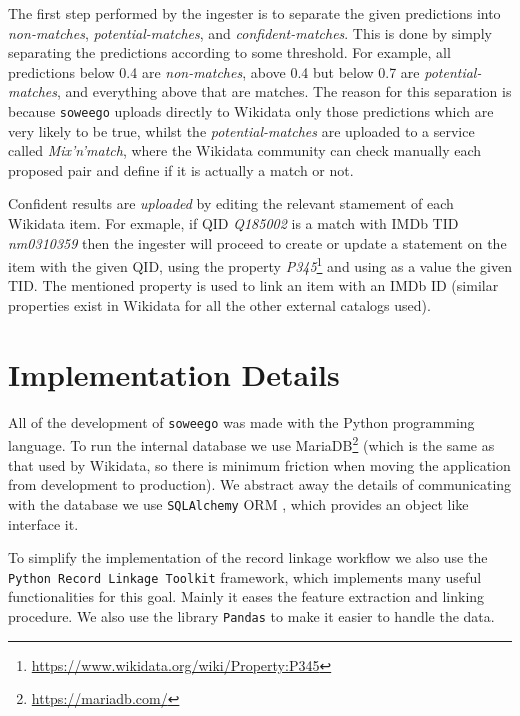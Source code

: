 \documentclass[epsfig,a4paper,11pt,titlepage,twoside,openany]{book}
\newcommand{\footurl}[1]{\footnote{\url{#1}}}
\begin{document}
The first step performed by the ingester is to separate the given predictions into \textit{non-matches}, \textit{potential-matches}, and \textit{confident-matches}. This is done by simply separating the predictions according to some threshold. For example, all predictions below 0.4 are \textit{non-matches}, above 0.4 but below 0.7 are \textit{potential-matches}, and everything above that are matches. The reason for this separation is because \texttt{soweego} uploads directly to Wikidata only those predictions which are very likely to be true, whilst the \textit{potential-matches} are uploaded to a service called \textit{Mix'n'match}, where the Wikidata community can check manually each proposed pair and define if it is actually a match or not.

Confident results are \textit{uploaded} by editing the relevant stamement of each Wikidata item. For exmaple, if QID \textit{Q185002} is a match with IMDb TID \textit{nm0310359} then the ingester will proceed to create or update a statement on the item with the given QID, using the property \textit{P345}\footurl{https://www.wikidata.org/wiki/Property:P345} and using as a value the given TID. The mentioned property is used to link an item with an IMDb ID (similar properties exist in Wikidata for all the other external catalogs used).


\section{Implementation Details}
\label{sec:soweego-implementation-details}

All of the development of \texttt{soweego} was made with the Python \cite{python-tutorial} programming language. To run the internal database we use MariaDB\footurl{https://mariadb.com/} (which is the same as that used by Wikidata, so there is minimum friction when moving the application from development to production). We abstract away the details of communicating with the database we use \texttt{SQLAlchemy} ORM \cite{sqlalchemy}, which provides an object like interface it.

To simplify the implementation of the record linkage workflow we also use the \texttt{Python Record Linkage Toolkit} \cite{recordlinkage-library} framework, which implements many useful functionalities for this goal. Mainly it eases the feature extraction and linking procedure. We also use the library \texttt{Pandas} \cite{mckinney-proc-scipy-2010} to make it easier to handle the data.
\end{document}
